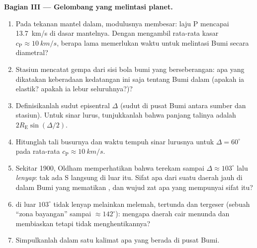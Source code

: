 \begin{problem}
\medskip\noindent\textbf{Bagian III --- Gelombang yang melintasi planet.}
\begin{enumerate}[resume]
  \item Pada tekanan mantel dalam, modulusnya membesar: laju P mencapai
        \qty{13.7}{km/s} di dasar mantelnya. Dengan mengambil rata-rata
        kasar $c_{\text{P}} \approx \qty{10}{km/s}$, berapa lama
         memerlukan waktu untuk melintasi Bumi secara
        diametral?
  \item Stasiun mencatat gempa dari sisi bola bumi yang berseberangan:
        apa yang dikatakan keberadaan kedatangan ini saja tentang Bumi
        dalam (apakah ia elastik? apakah ia lebur seluruhnya?)?
  \item Definisikanlah sudut episentral $\Delta$ (sudut di pusat Bumi
        antara sumber dan stasiun). Untuk sinar lurus, tunjukkanlah
        bahwa panjang talinya adalah $2R_{\text{E}}\sin(\Delta/2)$.
  \item Hitunglah tali busurnya dan waktu tempuh sinar lurusnya untuk
        $\Delta = 60^\circ$ pada rata-rata $c_{\text{P}} \approx
        \qty{10}{km/s}$.
  \item Sekitar 1900, Oldham memperhatikan bahwa  terekam
        sampai $\Delta \approx 103^\circ$ lalu \emph{lenyap}: tak ada S
        langsung di luar itu. Sifat apa dari suatu daerah jauh di dalam
        Bumi yang mematikan , dan wujud zat apa yang
        mempunyai sifat itu?
  \item {} di luar $103^\circ$ tidak lenyap melainkan melemah,
        tertunda dan tergeser (sebuah ``zona bayangan'' sampai
        $\approx 142^\circ$): mengapa daerah cair menunda dan membiaskan
         tetapi tidak menghentikannya?
  \item Simpulkanlah dalam satu kalimat apa yang berada di pusat Bumi.
\end{enumerate}


\end{problem}

